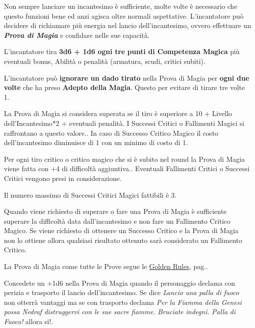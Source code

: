 \begin{multicols}{2}
Non sempre lanciare un incantesimo è sufficiente, molte volte è necessario che questo funzioni bene ed anzi agisca oltre normali aspettative. L'incantatore può decidere di richiamare più energia nel lancio dell'incantesimo, ovvero effettuare un \emph{\textbf{Prova di Magia}} e confidare nelle sue capacità.

L'incantatore tira \textbf{3d6 + 1d6 ogni tre punti di Competenza Magica} più eventuali bonus, Abilità o penalità (armatura, scudi, critici subiti).

L'incantatore può \textbf{ignorare un dado tirato} nella Prova di Magia per \textbf{ogni due volte} che ha preso \textbf{Adepto della Magia}. Questo per evitare di tirare tre volte 1.

La Prova di Magia si considera superata se il tiro è superiore a 10 + Livello dell'Incantesimo*2 + eventuali penalità. I Successi Critici o Fallimenti Magici si raffrontano a questo valore.. In caso di Successo Critico Magico il costo dell'incantesimo diminuisce di 1 con un minimo di costo di 1.

Per ogni tiro critico o critico magico che si è subito nel round la Prova di Magia viene fatta con +4 di difficoltà aggiuntiva.. Eventuali Fallimenti Critici o Successi Critici vengono presi in considerazione.

Il numero massimo di Successi Critici Magici fattibili è 3.

Quando viene richiesto di superare o fare una Prova di Magia è sufficiente superare la difficoltà data dall'incantesimo e non fare un Fallimento Critico Magico. Se viene richiesto di ottenere un Successo Critico e la Prova di Magia non lo ottiene allora qualsiasi risultato ottenuto sarà considerato un Fallimento Critico.

La Prova di Magia come tutte le Prove segue le \hyperlink{goldenrules}{Golden Rules}, pag.\pageref{goldenrules}.

\begin{narratore}
Concedete un +1d6 nella Prova di Magia quando il personaggio declama con perizia e trasporto il lancio dell'incantesimo. Se dice \emph{Lancio una palla di fuoco} non otterrà vantaggi ma se con trasporto declama \emph{Per la Fiamma della Genesi possa Nedraf distruggervi con le sue sacre fiamme. Bruciate indegni. Palla di Fuoco!} allora si!.

\medskip


\end{narratore}
\end{multicols}
